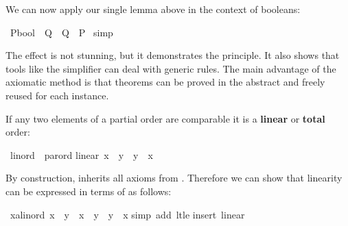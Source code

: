 \begin{isabellebody}
\begin{isamarkuptext}
We can now apply our single lemma above in the context of booleans:%
\end{isamarkuptext}%
\isamarkuptrue%
\isamarkupfalse%
\ {\isachardoublequoteopen}{\isacharparenleft}P{\isacharcolon}{\isacharcolon}bool{\isacharparenright}\ {\isacharless}{\isacharless}\ Q\ {\isasymLongrightarrow}\ {\isasymnot}{\isacharparenleft}Q\ {\isacharless}{\isacharless}\ P{\isacharparenright}{\isachardoublequoteclose}\isanewline
%
\isadelimproof
%
\endisadelimproof
%
\isatagproof
{}\isamarkupfalse%
\ simp%
\endisatagproof
{\isafoldproof}%
%
\isadelimproof
%
\endisadelimproof
%
\begin{isamarkuptext}%
\noindent
The effect is not stunning, but it demonstrates the principle.  It also shows
that tools like the simplifier can deal with generic rules.
The main advantage of the axiomatic method is that
theorems can be proved in the abstract and freely reused for each instance.%
\end{isamarkuptext}%
\isamarkuptrue%
%
\isamarkuptrue%
%
\begin{isamarkuptext}%
If any two elements of a partial order are comparable it is a
\textbf{linear} or \textbf{total} order:%
\end{isamarkuptext}%
\isamarkuptrue%
\isamarkupfalse%
\ linord\ {\isacharless}\ parord\isanewline
linear{\isacharcolon}\ {\isachardoublequoteopen}x\ {\isacharless}{\isacharless}{\isacharequal}\ y\ {\isasymor}\ y\ {\isacharless}{\isacharless}{\isacharequal}\ x{\isachardoublequoteclose}%
\begin{isamarkuptext}%
\noindent
By construction,  inherits all axioms from .
Therefore we can show that linearity can be expressed in terms of \isa{{\isacharless}{\isacharless}}
as follows:%
\end{isamarkuptext}%
\isamarkuptrue%
\isamarkupfalse%
\ {\isachardoublequoteopen}{\isasymAnd}x{\isacharcolon}{\isacharcolon}{\isacharprime}a{\isacharcolon}{\isacharcolon}linord{\isachardot}\ x\ {\isacharless}{\isacharless}\ y\ {\isasymor}\ x\ {\isacharequal}\ y\ {\isasymor}\ y\ {\isacharless}{\isacharless}\ x{\isachardoublequoteclose}\isanewline
%
\isadelimproof
%
\endisadelimproof
%
\isatagproof
{}\isamarkupfalse%
{\isacharparenleft}simp\ add{\isacharcolon}\ lt{\isacharunderscore}le{\isacharparenright}\isanewline
{}\isamarkupfalse%
{\isacharparenleft}insert\ linear{\isacharparenright}\isanewline
{}\isamarkupfalse%

\end{isabellebody}
